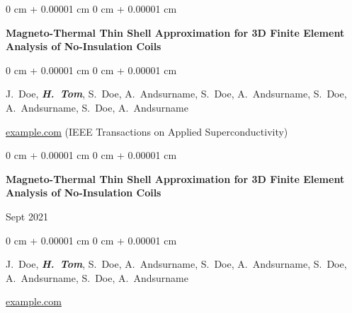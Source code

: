 \documentclass[10pt, letterpaper]{article}
\newenvironment{onecolentry}{
    \begin{adjustwidth}{
        0 cm + 0.00001 cm
    }{
        0 cm + 0.00001 cm
    }
}{
    \end{adjustwidth}
} %
\newenvironment{twocolentry}[2][]{
    \onecolentry
    \def\secondColumn{#2}
    \setcolumnwidth{\fill, 4.5 cm}
    \begin{paracol}{2}
}{
    \switchcolumn \raggedleft \secondColumn
    \end{paracol}
    \endonecolentry
} %
\begin{document}
        \vspace{0.2 cm}

        \begin{samepage}
            \begin{onecolentry}
                \textbf{Magneto-Thermal Thin Shell Approximation for 3D Finite Element Analysis of No-Insulation Coils}
            \end{onecolentry}

            \vspace{0.10 cm}
            
            \begin{onecolentry}
                \mbox{J. Doe}, \mbox{\textbf{\textit{H. Tom}}}, \mbox{S. Doe}, \mbox{A. Andsurname}, \mbox{S. Doe}, \mbox{A. Andsurname}, \mbox{S. Doe}, \mbox{A. Andsurname}, \mbox{S. Doe}, \mbox{A. Andsurname}

                \vspace{0.10 cm}
                
        \href{https://example.com}{example.com} (IEEE Transactions on Applied Superconductivity)\end{onecolentry}
        \end{samepage}

        \vspace{0.2 cm}

        \begin{samepage}
            \begin{twocolentry}{
                Sept 2021
            }
                \textbf{Magneto-Thermal Thin Shell Approximation for 3D Finite Element Analysis of No-Insulation Coils}
            \end{twocolentry}

            \vspace{0.10 cm}
            
            \begin{onecolentry}
                \mbox{J. Doe}, \mbox{\textbf{\textit{H. Tom}}}, \mbox{S. Doe}, \mbox{A. Andsurname}, \mbox{S. Doe}, \mbox{A. Andsurname}, \mbox{S. Doe}, \mbox{A. Andsurname}, \mbox{S. Doe}, \mbox{A. Andsurname}

                \vspace{0.10 cm}
                
        \href{https://example.com}{example.com}\end{onecolentry}
        \end{samepage}
\end{document}
